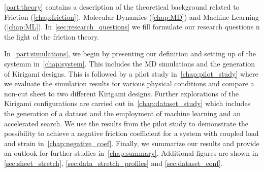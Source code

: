 \cref{part:theory} contains a description of the theoretical background related to
Friction (\cref{chap:friction}), Molecular Dynamics (\cref{chap:MD}) and Machine
Learning (\cref{chap:ML}). In~\cref{sec:research_questions} we fill formulate our research questions n the light of the friction theory.  

In~\cref{part:simulations}, we begin by presenting our definition and setting up of the systemm in~\cref{chap:system}. This includes the \acrshort{MD} simulations and the generation of Kirigami designs. This is followed by a pilot study
in~\cref{chap:pilot_study} where we evaluate the simulation results for various
physical conditions and compare a non-cut sheet to two different Kirigami
designs. Further explorations of the Kirigami configurations are carried out in~\cref{chap:dataset_study} which includes the generation of a dataset and the
employment of machine learning and an accelerated search. We use the results
from the pilot study to demonstrate the possibility to achieve a negative
friction coefficient for a system with coupled load and strain
in~\cref{chap:negative_coef}. Finally, we summarize our results and provide an
outlook for further studies in~\cref{chap:summary}. Additional figures are shown
in \cref{sec:sheet_stretch}, \cref{sec:data_stretch_profiles} and
\cref{sec:dataset_conf}. 










